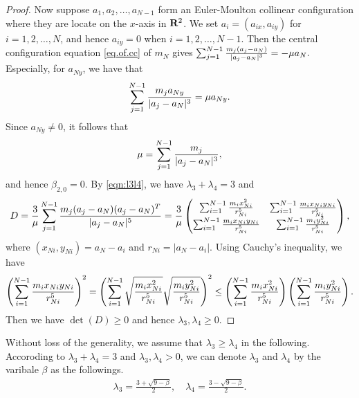 \documentclass[11pt]{article}
\def\lb{\label}
\def\R{{\bf R}}
\def\bb{{\beta}}
\def\cA{{\cal A}}
\begin{document}
\begin{proof}
Now suppose $a_1,a_2,\ldots,a_{N-1}$ form an Euler-Moulton collinear configuration where they are locate on the $x$-axis in $\R^2$. 
We set $a_i=(a_{ix},a_{iy})$ for $i=1,2,\ldots,N$,
and hence $a_{iy}=0$ when $i=1,2,\ldots,N-1$.
Then the central configuration equation \eqref{eq.of.cc} of $m_N$ gives
$
\sum_{j=1}^{N-1}{m_j(a_j-a_N)\over|a_j-a_N|^3}=-\mu a_N.
$
Especially, for $a_{Ny}$, we have that 
\begin{equation}
\sum_{j=1}^{N-1}{m_ja_{Ny}\over|a_j-a_N|^3}=\mu a_{Ny}.
\end{equation}
Since $a_{Ny}\ne0$, it follows that 
\begin{equation}\label{second.formula.of.mu}
\mu=\sum_{j=1}^{N-1}{m_j\over|a_j-a_N|^3},
\end{equation}
and hence $\beta_{2,0}=0$. By \eqref{eqn:l3l4}, we have
$\lambda_3+\lambda_4=3$
and
\begin{align}
D={3\over\mu}\sum_{j=1}^{N-1}{m_j(a_j-a_N)(a_j-a_N)^T\over|a_j-a_N|^5}
={3\over\mu}
\begin{pmatrix}
       \sum_{i=1}^{N-1}{m_ix_{Ni}^2\over r_{Ni}^5} &
	\sum_{i=1}^{N-1}{m_ix_{Ni}y_{Ni}\over r_{Ni}^5}\\
	\sum_{i=1}^{N-1}{m_ix_{Ni}y_{Ni}\over r_{Ni}^5} &
	\sum_{i=1}^{N-1}{m_iy_{Ni}^2\over r_{Ni}^5} 
\end{pmatrix},\lb{eqn:D}
\end{align}
where $(x_{Ni},y_{Ni})=a_N-a_i$ and $r_{Ni}=|a_N-a_i|$.
Using Cauchy's inequality, we have
\begin{equation}
\left(\sum_{i=1}^{N-1}{m_ix_{Ni}y_{Ni}\over r_{Ni}^5}\right)^2
=\left(\sum_{i=1}^{N-1}\sqrt{m_ix_{Ni}^2\over r_{Ni}^5}\sqrt{m_iy_{Ni}^2\over r_{Ni}^5}\right)^2
\le\left(\sum_{i=1}^{N-1}{m_ix_{Ni}^2\over r_{Ni}^5}\right)
   \left(\sum_{i=1}^{N-1}{m_iy_{Ni}^2\over r_{Ni}^5}\right).
\end{equation}
Then we have $\det(D)\ge0$ and hence $\lambda_3,\lambda_4 \geq 0$. 
\end{proof}

Without loss of the generality, we assume that $\lambda_3 \geq \lambda_4$ in the following.
Accoroding to $\lambda_3 + \lambda_4 = 3$ and $\lambda_3, \lambda_4 > 0$, we can denote $\lambda_3$ and $\lambda_4$ by the varibale $\beta$ as the followings. 
\begin{align}
  \lambda_3 = \frac{3 + \sqrt{9 -\beta}}{2}, \quad \lambda_4 = \frac{3 - \sqrt{9 -\beta}}{2}.
\end{align}
\end{document}
